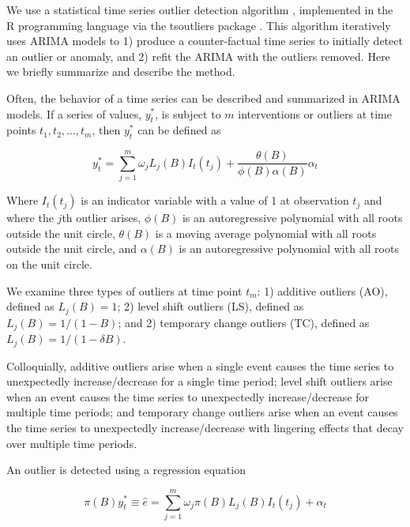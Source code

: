 \documentclass[12pt]{article}
\begin{document}
We use a statistical time series outlier detection algorithm
\citep{chen1993joint}, implemented in the R programming language
\citep{rcore} via the tsoutliers package \citep{tsoutliers2019}. This
algorithm iteratively uses ARIMA models to 1) produce a counter-factual
time series to initially detect an outlier or anomaly, and 2) refit the
ARIMA with the outliers removed. Here we briefly summarize and describe
the method.

Often, the behavior of a time series can be described and summarized in
ARIMA models. If a series of values, \(y_t^*\), is subject to \(m\)
interventions or outliers at time points \(t_1,t_2,…,t_m\), then
\(y_t^*\) can be defined as

\[y_t^* = \sum_{j=1}^{m} \omega_jL_j(B)I_t(t_j) + \frac{\theta(B)}{\phi(B)\alpha(B)}\alpha_t\]

Where \(I_t(t_j)\) is an indicator variable with a value of 1 at
observation \(t_j\) and where the \(j\)th outlier arises, \(\phi(B)\) is
an autoregressive polynomial with all roots outside the unit circle,
\(\theta(B)\) is a moving average polynomial with all roots outside the
unit circle, and \(\alpha(B)\) is an autoregressive polynomial with all
roots on the unit circle.

We examine three types of outliers at time point \(t_m\): 1) additive
outliers (AO), defined as \(L_j(B)=1\); 2) level shift outliers (LS),
defined as \(L_j(B) = 1/(1-B)\); and 2) temporary change outliers (TC),
defined as \(L_j(B) = 1/(1-\delta B)\).

Colloquially, additive outliers arise when a single event causes the
time series to unexpectedly increase/decrease for a single time period;
level shift outliers arise when an event causes the time series to
unexpectedly increase/decrease for multiple time periods; and temporary
change outliers arise when an event causes the time series to
unexpectedly increase/decrease with lingering effects that decay over
multiple time periods.

An outlier is detected using a regression equation

\[ \pi(B)y_t^* \equiv \hat{e} = \sum_{j=1}^m \omega_j \pi(B)L_j(B)I_t(t_j) + \alpha_t \]
\end{document}
